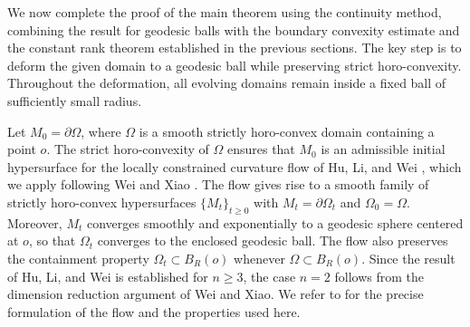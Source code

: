 \documentclass[11pt]{amsart}
\numberwithin{theorem}{section}
\numberwithin{equation}{section}
\begin{document}
We now complete the proof of the main theorem using the continuity method, combining the result for geodesic balls with the boundary convexity estimate and the constant rank theorem established in the previous sections. The key step is to deform the given domain to a geodesic ball while preserving strict horo-convexity. Throughout the deformation, all evolving domains remain inside a fixed ball of sufficiently small radius.

Let $M_0=\partial\Omega$, where $\Omega$ is a smooth strictly horo-convex domain containing a point $o$. The strict horo-convexity of $\Omega$ ensures that $M_0$ is an admissible initial hypersurface for the locally constrained curvature flow of Hu, Li, and Wei \cite{Hu-LW2022}, which we apply following Wei and Xiao \cite{Wei-Xiao2025}. The flow gives rise to a smooth family of strictly horo-convex hypersurfaces $\{M_t\}_{t\geq 0}$ with $M_t=\partial\Omega_t$ and $\Omega_0=\Omega$. Moreover, $M_t$ converges smoothly and exponentially to a geodesic sphere centered at $o$, so that $\Omega_t$ converges to the enclosed geodesic ball. The flow also preserves the containment property $\Omega_t\subset B_R(o)$ whenever $\Omega\subset B_R(o)$. Since the result of Hu, Li, and Wei \cite{Hu-LW2022} is established for $n\geq 3$, the case $n=2$ follows from the dimension reduction argument of Wei and Xiao. We refer to \cite[Sections 3 and 4]{Wei-Xiao2025} for the precise formulation of the flow and the properties used here.
\end{document}
